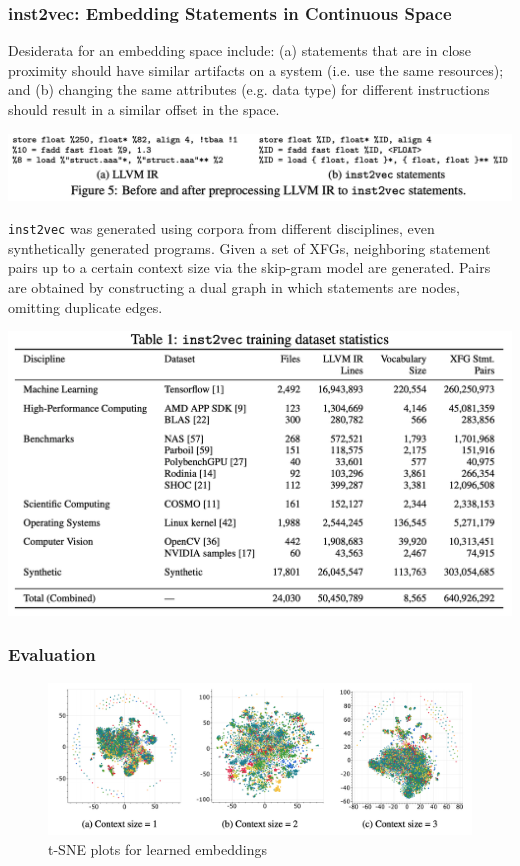 \documentclass{article}
\begin{document}
\subsubsection{inst2vec: Embedding Statements in Continuous Space}
Desiderata for an embedding space include: (a) statements that are in close proximity should have similar artifacts on a system (i.e. use the same resources); and (b) changing the same attributes (e.g. data type) for different instructions should result in a similar offset in the space.
\centerline{\includegraphics[width=\columnwidth]{Images/Similarity4-3.png}}
\texttt{inst2vec} was generated using corpora from different disciplines, even synthetically generated programs. Given a set of XFGs, neighboring statement pairs up to a certain context size via the skip-gram model are generated.
Pairs are obtained by constructing a dual graph in which statements are nodes, omitting duplicate edges.
\centerline{\includegraphics[width=\columnwidth]{Images/Similarity4-4.png}}
\subsubsection{Evaluation}
\begin{figure}[ht]
    \centerline{\includegraphics[width=\columnwidth]{Images/Similarity4-5.png}}
    \caption{t-SNE plots for learned embeddings}
\end{figure}
\end{document}
